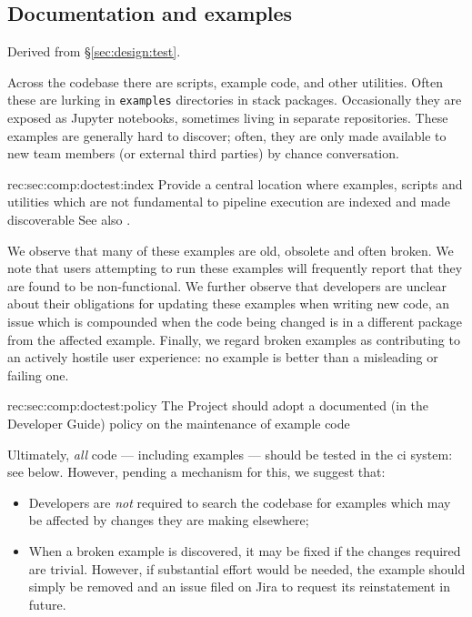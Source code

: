 \subsection{Documentation and examples}
\label{sec:comp:doctest}

Derived from \S\ref{sec:design:test}.

Across the codebase there are scripts, example code, and other utilities.
Often these are lurking in \texttt{examples} directories in stack packages.
Occasionally they are exposed as Jupyter notebooks, sometimes living in separate repositories.
These examples are generally hard to discover; often, they are only made available to new team members (or external third parties) by chance conversation.

\begin{recommendation}
    {rec:sec:comp:doctest:index}
    {Provide a central location where examples, scripts and utilities which are not fundamental to pipeline execution are indexed and made discoverable}
See also .
\end{recommendation}

We observe that many of these examples are old, obsolete and often broken.
We note that users attempting to run these examples will frequently report that they are found to be non-functional.
We further observe that developers are unclear about their obligations for updating these examples when writing new code, an issue which is compounded when the code being changed is in a different package from the affected example.
Finally, we regard broken examples as contributing to an actively hostile user experience: no example is better than a misleading or failing one.

\begin{recommendation}
    {rec:sec:comp:doctest:policy}
    {The Project should adopt a documented (in the Developer Guide) policy on the maintenance of example code}
\end{recommendation}

Ultimately, \emph{all} code --- including examples --- should be tested in the \gls{ci} system: see below.
However, pending a mechanism for this, we suggest that:

\begin{itemize}
    \item{Developers are \textit{not} required to search the codebase for examples which may be affected by changes they are making elsewhere;}
    \item{
        When a broken example is discovered, it may be fixed if the changes required are trivial.
        However, if substantial effort would be needed, the example should simply be removed and an issue filed on Jira to request its reinstatement in future.
    }
\end{itemize}

